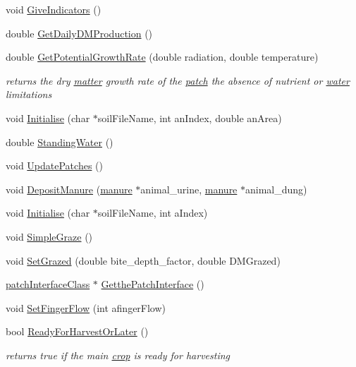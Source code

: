 \begin{DoxyCompactItemize}
void \hyperlink{classpatch_a264e98a8bd59a3e2268e3edb8e440103}{GiveIndicators} ()
\item 
double \hyperlink{classpatch_a334f1d4bec7e4b63de7f008255b10904}{GetDailyDMProduction} ()
\item 
double \hyperlink{classpatch_a1084593c1a741685fc7277569df31516}{GetPotentialGrowthRate} (double radiation, double temperature)
\begin{DoxyCompactList}\small\item\em returns the dry \hyperlink{classmatter}{matter} growth rate of the \hyperlink{classpatch}{patch} the absence of nutrient or \hyperlink{classwater}{water} limitations \item\end{DoxyCompactList}\item 
void \hyperlink{classpatch_aed7ec6869d21a7bae66741051b8056e2}{Initialise} (char $\ast$soilFileName, int anIndex, double anArea)
\item 
double \hyperlink{classpatch_a9ba4cf30533b050cb7e87b58defd4268}{StandingWater} ()
\item 
void \hyperlink{classpatch_a6e23eb42dae4af96e728568fc35ac256}{UpdatePatches} ()
\item 
void \hyperlink{classpatch_a710f7413560c8b891d35212341731b02}{DepositManure} (\hyperlink{classmanure}{manure} $\ast$animal\_\-urine, \hyperlink{classmanure}{manure} $\ast$animal\_\-dung)
\item 
void \hyperlink{classpatch_a92a760b5e2e027638c445888038d82fe}{Initialise} (char $\ast$soilFileName, int aIndex)
\item 
void \hyperlink{classpatch_a6b0055a5b5aa214e2f9e8f5024c942aa}{SimpleGraze} ()
\item 
void \hyperlink{classpatch_a691aceb2b8472215986518945b3b01d2}{SetGrazed} (double bite\_\-depth\_\-factor, double DMGrazed)
\item 
\hyperlink{classpatch_interface_class}{patchInterfaceClass} $\ast$ \hyperlink{classpatch_a537dde06dbfd967daf158975f4de51b4}{GetthePatchInterface} ()
\item 
void \hyperlink{classpatch_a79adbf0a0c1fee340accf581487d8f54}{SetFingerFlow} (int afingerFlow)
\item 
bool \hyperlink{classpatch_add309282252f1c83d6ad6ff827bd0c23}{ReadyForHarvestOrLater} ()
\begin{DoxyCompactList}\small\item\em returns true if the main \hyperlink{classcrop}{crop} is ready for harvesting \item\end{DoxyCompactList}\item 

\end{DoxyCompactItemize}
